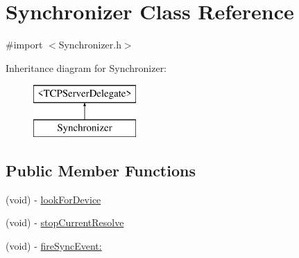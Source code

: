 \hypertarget{interface_synchronizer}{
\section{Synchronizer Class Reference}
\label{interface_synchronizer}
}


{\ttfamily \#import $<$Synchronizer.h$>$}

Inheritance diagram for Synchronizer:\begin{figure}[H]
\begin{center}
\leavevmode
\includegraphics[height=2.000000cm]{interface_synchronizer}
\end{center}
\end{figure}
\subsection*{Public Member Functions}
\begin{DoxyCompactItemize}
\item 
(void) -\/ \hyperlink{interface_synchronizer_a98e362afffd0b73137550ab1186ba7af}{lookForDevice}
\item 
(void) -\/ \hyperlink{interface_synchronizer_a1ae590a78324a54f1a281aba5e47ede9}{stopCurrentResolve}
\item 
(void) -\/ \hyperlink{interface_synchronizer_aedd53710a9acd0572fecfc839215a661}{fireSyncEvent:}
\end{DoxyCompactItemize}
